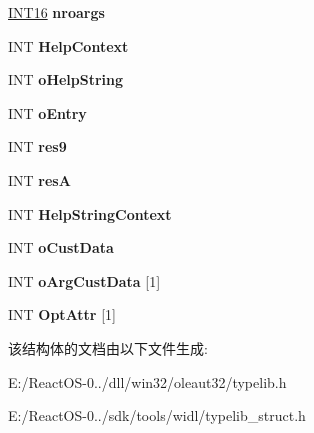 \begin{DoxyCompactItemize}
\hyperlink{_processor_bind_8h_a30f500129d8c688af07726d5d34ce52d}{I\+N\+T16} {\bfseries nroargs}
\item 
\mbox{\label{struct_m_s_f_t___func_record_ac50c93d9b8f3e3e6622cdbcde2e5b02e}} 
I\+NT {\bfseries Help\+Context}
\item 
\mbox{\label{struct_m_s_f_t___func_record_a689ef9c1cfb3f829fc5e2a7ededa3f58}} 
I\+NT {\bfseries o\+Help\+String}
\item 
\mbox{\label{struct_m_s_f_t___func_record_ac8eecdfc13c0300c2dc98e61e7c20d0c}} 
I\+NT {\bfseries o\+Entry}
\item 
\mbox{\label{struct_m_s_f_t___func_record_ab3405b0b111616c338efcd049bbac425}} 
I\+NT {\bfseries res9}
\item 
\mbox{\label{struct_m_s_f_t___func_record_a220842c0d965d405cfe2761624f8bab6}} 
I\+NT {\bfseries resA}
\item 
\mbox{\label{struct_m_s_f_t___func_record_a2e9b9315a4038507aff0d3e40fb7e32a}} 
I\+NT {\bfseries Help\+String\+Context}
\item 
\mbox{\label{struct_m_s_f_t___func_record_ab50d2bcded9dc84465425576a23c467b}} 
I\+NT {\bfseries o\+Cust\+Data}
\item 
\mbox{\label{struct_m_s_f_t___func_record_a21a2a8d39809edb1e48ecea0595c0400}} 
I\+NT {\bfseries o\+Arg\+Cust\+Data} \mbox{[}1\mbox{]}
\item 
\mbox{\label{struct_m_s_f_t___func_record_a4ea61fd6ec9bb7963811b404b738eb71}} 
I\+NT {\bfseries Opt\+Attr} \mbox{[}1\mbox{]}
\end{DoxyCompactItemize}


该结构体的文档由以下文件生成\+:\begin{DoxyCompactItemize}
\item 
E\+:/\+React\+O\+S-\/0../dll/win32/oleaut32/typelib.\+h\item 
E\+:/\+React\+O\+S-\/0../sdk/tools/widl/typelib\+\_\+struct.\+h\end{DoxyCompactItemize}
